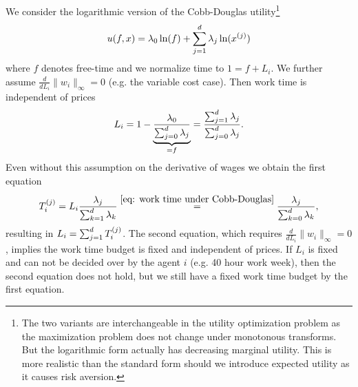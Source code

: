 \begin{lemma}
	We consider the logarithmic version of the Cobb-Douglas utility\footnote{
		The two variants are interchangeable in the utility optimization problem
		as the maximization problem does not change under monotonous transforms.
		But the logarithmic form actually has decreasing marginal utility. This is
		more realistic than the standard form should we introduce expected utility
		as it causes risk aversion.
	}
	\[
		u(f,x) = \lambda_0 \ln(f) + \sum_{j=1}^d \lambda_j \ln(x^{(j)})
	\]
	where \(f\) denotes free-time and we normalize time to \(1=f+L_i\). We
	further assume	 \(\frac{d}{dL_i}\|w_i\|_\infty=0\) (e.g. the variable cost
	case). Then work time is independent of prices
	\begin{equation}\label{eq: work time under Cobb-Douglas}
		L_i = 1- \underbrace{\frac{\lambda_0}{\sum_{j=0}^d \lambda_j}}_{=f}
		= \frac{\sum_{j=1}^d \lambda_j}{\sum_{j=0}^d \lambda_j}.
	\end{equation}
	Even without this assumption on the derivative of wages we obtain
	the first equation
	\[
		T_i^{(j)}
		= L_i\frac{\lambda_j}{\sum_{k=1}^d\lambda_k}
		\overset{\eqref{eq: work time under Cobb-Douglas}}=
		\frac{\lambda_j}{\sum_{k=0}^d\lambda_k},
	\]
	resulting in  \(L_i = \sum_{j=1}^d T_i^{(j)}\). The second equation,
	which requires \(\frac{d}{dL_i}\|w_i\|_\infty=0\), implies the work time
	budget is fixed and independent of prices. If \(L_i\) is fixed and can
	not be decided over by the agent \(i\) (e.g. 40 hour work week), then
	the second equation does not hold, but we still have a fixed work time
	budget by the first equation.
\end{lemma}
